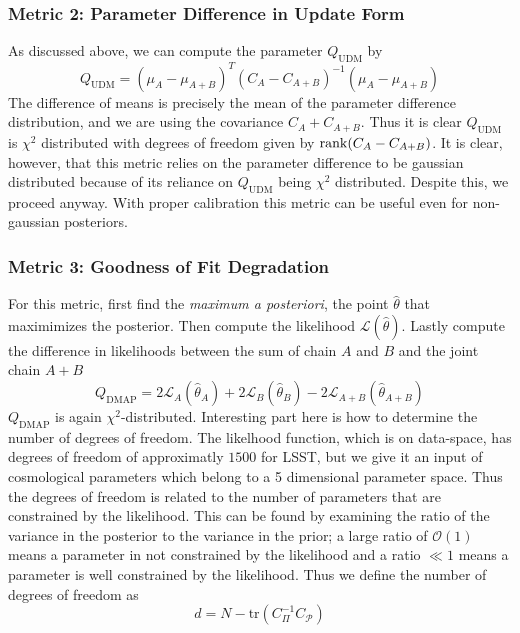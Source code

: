 \subsubsection{Metric 2: Parameter Difference in Update Form}
As discussed above, we can compute the parameter $Q_{\mathrm{UDM}}$ by
\begin{equation}
    Q_{\mathrm{UDM}} = {(\mu_A - \mu_{A+B})}^T{(C_A-C_{A+B})}^{-1}(\mu_A - \mu_{A+B}) 
\end{equation}
The difference of means is precisely the mean of the parameter difference distribution, and we are using the covariance $C_A+C_{A+B}$.
Thus it is clear $Q_{\mathrm{UDM}}$ is $\chi^2$ distributed with degrees of freedom given by $\rank(C_A-C_{A+B})$. 
It is clear, however, that this metric relies on the parameter difference to be gaussian distributed because of its reliance on $Q_{\mathrm{UDM}}$ being $\chi^2$ distributed. Despite this, we proceed anyway. With proper calibration this metric can be useful even for non-gaussian posteriors.

\subsubsection{Metric 3: Goodness of Fit Degradation}
For this metric, first find the \textit{maximum a posteriori}, the point $\hat\theta$ that maximimizes the posterior. Then compute the likelihood $\mathcal{L}(\hat\theta)$. Lastly compute the difference in likelihoods between the sum of chain $A$ and $B$ and the joint chain $A+B$
\begin{equation}
	Q_{\mathrm{DMAP}} = 2\mathcal{L}_A(\hat\theta_A) + 2\mathcal{L}_B(\hat\theta_B) - 2\mathcal{L}_{A+B}(\hat\theta_{A+B})
\end{equation}
$Q_{\mathrm{DMAP}}$ is again $\chi^2$-distributed. Interesting part here is how to determine the number of degrees of freedom. The likelhood function, which is on data-space, has degrees of freedom of approximatly $1500$ for LSST, but we give it an input of cosmological parameters which belong to a 5 dimensional parameter space. Thus the degrees of freedom is related to the number of parameters that are constrained by the likelihood. This can be found by examining the ratio of the variance in the posterior to the variance in the prior; a large ratio of $\mathcal{O}(1)$ means a parameter in not constrained by the likelihood and a ratio $\ll 1$ means a parameter is well constrained by the likelihood. Thus we define the number of degrees of freedom as
\begin{equation}
	d = N-\mathrm{tr}(C_\Pi^{-1}C_\mathcal{P})
\end{equation}

